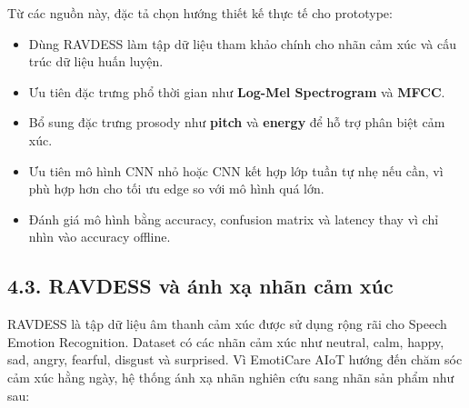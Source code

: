 \documentclass[12pt,a4paper]{article}
\begin{document}
Từ các nguồn này, đặc tả chọn hướng thiết kế thực tế cho prototype:


\begin{itemize}
\item Dùng RAVDESS làm tập dữ liệu tham khảo chính cho nhãn cảm xúc và cấu trúc dữ liệu huấn luyện.
\item Ưu tiên đặc trưng phổ thời gian như \textbf{Log-Mel Spectrogram} và \textbf{MFCC}.
\item Bổ sung đặc trưng prosody như \textbf{pitch} và \textbf{energy} để hỗ trợ phân biệt cảm xúc.
\item Ưu tiên mô hình CNN nhỏ hoặc CNN kết hợp lớp tuần tự nhẹ nếu cần, vì phù hợp hơn cho tối ưu edge so với mô hình quá lớn.
\item Đánh giá mô hình bằng accuracy, confusion matrix và latency thay vì chỉ nhìn vào accuracy offline.
\end{itemize}

\subsection*{4.3. RAVDESS và ánh xạ nhãn cảm xúc}

RAVDESS là tập dữ liệu âm thanh cảm xúc được sử dụng rộng rãi cho Speech Emotion Recognition. Dataset có các nhãn cảm xúc như neutral, calm, happy, sad, angry, fearful, disgust và surprised. Vì EmotiCare AIoT hướng đến chăm sóc cảm xúc hằng ngày, hệ thống ánh xạ nhãn nghiên cứu sang nhãn sản phẩm như sau:
\end{document}
